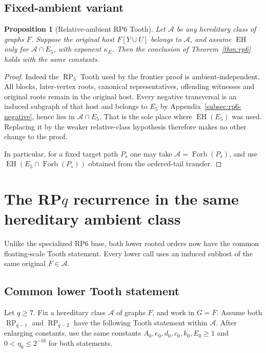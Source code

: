 \documentclass[11pt,a4paper]{article}
\newtheorem{proposition}[theorem]{Proposition}
\theoremstyle{definition}
\theoremstyle{remark}
\numberwithin{equation}{section}
\DeclareMathOperator{\RP}{RP}
\begin{document}
\subsection{Fixed-ambient variant}\label{subsec:rp6-relative}
\begin{proposition}[Relative-ambient RP6 Tooth]\label{prop:rp6-relative}
Let \(\mathcal A\) be any hereditary class of graphs \(F\). Suppose the original host \(F[Y \cup  U]\) belongs to \(\mathcal A\), and assume \(\operatorname{EH}\) only for \(\mathcal A\cap  E_{5}\), with exponent \(\kappa_{E}\). Then the conclusion of Theorem~\ref{thm:rp6} holds with the same constants.
\end{proposition}
\begin{proof}
Indeed the \(\operatorname{RP}_{5}\) Tooth used by the frontier proof is ambient-independent. All blocks, later-vertex roots, canonical representatives, offending witnesses and original roots remain in the original host. Every negative transversal is an induced subgraph of that host and belongs to \(E_{5}\) by Appendix~\ref{subsec:rp6-negative}, hence lies in \(\mathcal A\cap  E_{5}\). That is the sole place where \(\operatorname{EH}(E_{5})\) was used. Replacing it by the weaker relative-class hypothesis therefore makes no other change to the proof.

In particular, for a fixed target path \(P_{s}\) one may take \(\mathcal A=\operatorname{Forb}(P_{s})\), and use \(\operatorname{EH}(E_{5} \cap  \operatorname{Forb}(P_{s}))\) obtained from the ordered-tail transfer.
\end{proof}

\section{The \texorpdfstring{RP\(q\)}{RPq} recurrence in the same hereditary ambient class}\label{app:rpq}

Unlike the specialized RP6 base, both lower rooted orders now have the common floating-scale Tooth statement. Every lower call uses an induced subhost of the same original \(F\in\mathcal A\).

\subsection{Common lower Tooth statement}\label{subsec:rpq-lower}
Let \(q\ge\allowbreak 7\). Fix a hereditary class \(\mathcal A\) of graphs \(F\), and work in \(G=\overline{F}\). Assume both \(\RP_{q-1}\) and \(\RP_{q-2}\) have the following Tooth statement within \(\mathcal A\). After enlarging constants, use the same constants \(A_{0},\allowbreak e_{0},\allowbreak d_{0},\allowbreak c_{0},\allowbreak k_{0},\allowbreak E_{0} \ge\allowbreak 1\) and \(0<\eta_{0}\le\allowbreak 2^{-16}\) for both statements.
\end{document}
